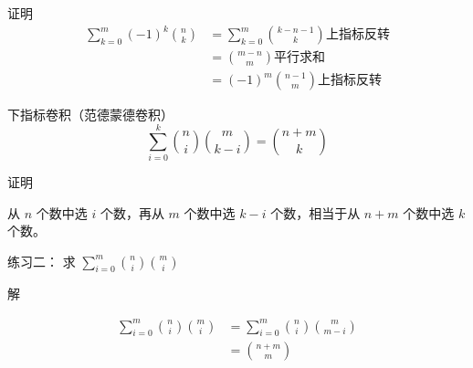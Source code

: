 \documentclass[UTF8]{beamer}
\begin{document}
    \begin{frame}
      证明
      \[
      \begin{aligned}
        \sum\limits_{k=0}^{m}(-1)^k{n \choose k}&=\sum\limits_{k=0}^{m}{k-n-1 \choose k} \text{上指标反转} \\
        &={m-n \choose m}  \text{平行求和} \\
        &=(-1)^m{n-1 \choose m} \text{上指标反转}
      \end{aligned}
      \]
      \pause
      \begin{block}{下指标卷积（范德蒙德卷积）}\label{ux4e0bux6307ux6807ux5377ux79efux8303ux5fb7ux8499ux5fb7ux5377ux79ef}
      \[
      \sum\limits_{i=0}^k{n \choose i}{m \choose k-i}={n+m \choose k}
      \]
      \end{block}
      \pause
      证明

      从 \(n\) 个数中选 \(i\) 个数，再从 \(m\) 个数中选 \(k-i\) 个数，相当于从
      \(n+m\) 个数中选 \(k\) 个数。
    \end{frame}

    \begin{frame}
      \begin{block}{练习二：}\label{ux7ec3ux4e60ux4e8c}
      求 \(\sum\limits_{i=0}^{m}{n \choose i}{m \choose i}\)
      \end{block}
      \pause
      解

      \[
      \begin{aligned}
      \sum\limits_{i=0}^{m}{n \choose i}{m \choose i}&=\sum\limits_{i=0}^{m}{n \choose i}{m \choose m-i} \\
      &={n+m \choose m}
      \end{aligned}
      \]
    \end{frame}
\end{document}
